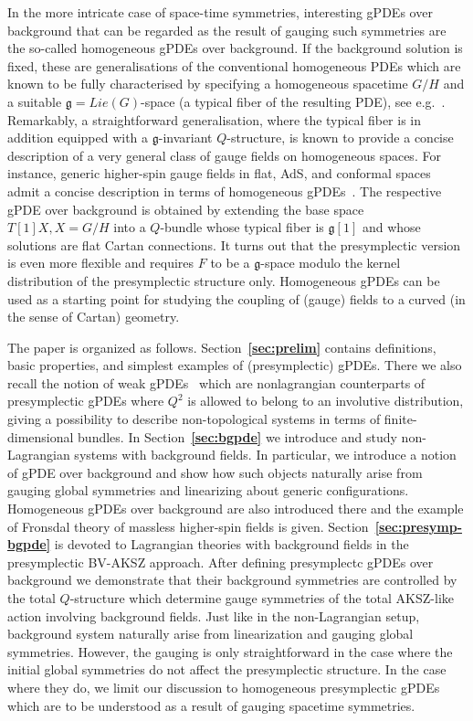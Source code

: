 \documentclass[a4paper,12pt]{article}
\numberwithin{equation}{section} %
\newcommand{\bref}[1]{\textbf{\ref{#1}}}
\newcommand{\Liealg}{\mathfrak}
\newcommand{\algg}{\Liealg{g}}
\begin{document}
In the more intricate case of space-time symmetries, interesting gPDEs over background that can be regarded as the result of gauging such symmetries are the so-called homogeneous gPDEs over background. If the background solution is fixed, these are generalisations of the conventional homogeneous PDEs which are known to be fully characterised by specifying a homogeneous spacetime $G/H$ and a suitable $\algg=Lie(G)$-space (a typical fiber of the resulting PDE), see e.g.~\cite{Eastwood,cap2009parabolic}. Remarkably, a straightforward generalisation, where the typical fiber is in addition equipped with a $\algg$-invariant $Q$-structure, is known to provide a concise description of a very general class of gauge fields on homogeneous spaces. For instance, generic higher-spin gauge fields in flat, AdS, and conformal spaces admit a concise description in terms of homogeneous gPDEs~\cite{Barnich:2004cr,Barnich:2006pc,Alkalaev:2008gi,Bekaert:2009fg,Alkalaev:2009vm,Bekaert:2013zya,Chekmenev:2015kzf}. The respective gPDE over background is obtained by extending the base space $T[1]X,X=G/H$ into a $Q$-bundle whose typical fiber
is $\algg[1]$ and whose solutions are flat Cartan connections. It turns out that the presymplectic version is even more flexible and requires $F$ to be a $\algg$-space modulo the kernel distribution of the presymplectic structure only. Homogeneous gPDEs can be used as a starting point for studying the coupling of (gauge) fields to a curved (in the sense of Cartan) geometry. 

The paper is organized as follows. Section~\bref{sec:prelim} contains definitions, basic properties, and simplest examples of (presymplectic) gPDEs. There we also recall the notion of weak gPDEs~\cite{Grigoriev:2024ncm} which are nonlagrangian counterparts of presymplectic gPDEs where $Q^2$ is allowed to belong to an involutive distribution, giving a possibility to describe non-topological systems in terms of finite-dimensional bundles. In Section~\bref{sec:bgpde} we introduce and study non-Lagrangian systems with background fields. In particular, we introduce a notion of gPDE over background and show how such objects naturally arise from gauging global symmetries and linearizing about generic configurations. Homogeneous gPDEs over background are also introduced there and the example of Fronsdal theory of massless higher-spin fields is given. Section~\bref{sec:presymp-bgpde} is devoted to Lagrangian theories with background fields in the presymplectic BV-AKSZ approach. After defining presymplectc gPDEs over background we demonstrate that their background symmetries are controlled by the total $Q$-structure which determine gauge symmetries of the total AKSZ-like action involving background fields. Just like in the non-Lagrangian setup, background system naturally arise from linearization and gauging global symmetries. However,
the gauging is only straightforward in the case where the initial global symmetries do not affect the presymplectic structure. In the case where they do, we limit our discussion to homogeneous presymplectic gPDEs which are to be understood as a result of gauging spacetime symmetries.
\end{document}
